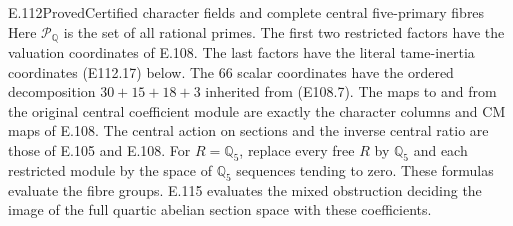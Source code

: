 \begin{statement}{E.112}{Proved}{Certified character fields and complete central five-primary fibres}
Here $\mathcal P_{\mathbb Q}$ is the set of all rational primes.
The first two restricted factors have the valuation coordinates
of E.108.  The last factors have the literal tame-inertia
coordinates (E112.17) below.  The $66$ scalar coordinates have
the ordered decomposition $30+15+18+3$ inherited from (E108.7).
The maps to and from the original central coefficient module
are exactly the character columns and CM maps of E.108.
The central action on sections and the inverse central ratio are
those of E.105 and E.108.
For $R=\mathbb Q_5$, replace every free $R$ by $\mathbb Q_5$
and each restricted module by the space of $\mathbb Q_5$
sequences tending to zero.  These formulas evaluate the fibre
groups. E.115 evaluates the mixed obstruction deciding the image
of the full quartic abelian section space with these coefficients.
\end{statement}

